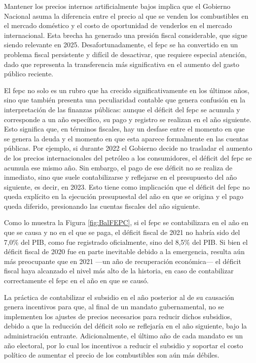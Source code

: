 Mantener los precios internos artificialmente bajos implica que el Gobierno Nacional asuma la diferencia entre el precio al que se venden los combustibles en el mercado doméstico y el costo de oportunidad de venderlos en el mercado internacional. Esta brecha ha generado una presión fiscal considerable, que sigue siendo relevante en 2025. Desafortunadamente, el \gls{fepc} se ha convertido en un problema fiscal persistente y difícil de desactivar, que requiere especial atención, dado que representa la transferencia más significativa en el aumento del gasto público reciente.

El \gls{fepc} no solo es un rubro que ha crecido significativamente en los últimos años, sino que también presenta una peculiaridad contable que genera confusión en la interpretación de las finanzas públicas: aunque el déficit del \gls{fepc} se acumula y corresponde a un año específico, su pago y registro se realizan en el año siguiente. Esto significa que, en términos fiscales, hay un desfase entre el momento en que se genera la deuda y el momento en que esta aparece formalmente en las cuentas públicas. Por ejemplo, si durante 2022 el Gobierno decide no trasladar el aumento de los precios internacionales del petróleo a los consumidores, el déficit del \gls{fepc} se acumula ese mismo año. Sin embargo, el pago de ese déficit no se realiza de inmediato, sino que suele contabilizarse y reflejarse en el presupuesto del año siguiente, es decir, en 2023. Esto tiene como implicación que el déficit del \gls{fepc} no queda explícito en la ejecución presupuestal del año en que se origina y el pago queda diferido, presionando las cuentas fiscales del año siguiente.



Como lo muestra la Figura \ref{fig:BalFEPC}, si el \gls{fepc} se contabilizara en el año en que se causa y no en el que se paga, el déficit fiscal de 2021 no habría sido del 7,0\% del PIB, como fue registrado oficialmente, sino del 8,5\% del PIB. Si bien el déficit fiscal de 2020 fue en parte inevitable debido a la emergencia, resulta aún más preocupante que en 2021 —un año de recuperación económica— el déficit fiscal haya alcanzado el nivel más alto de la historia, en caso de contabilizar correctamente el \gls{fepc} en el año en que se causó. 

La práctica de contabilizar el subsidio en el año posterior al de su causación genera incentivos para que, al final de un mandato gubernamental, no se implementen los ajustes de precios necesarios para reducir dichos subsidios, debido a que la reducción del déficit solo se reflejaría en el año siguiente, bajo la administración entrante. Adicionalmente, el último año de cada mandato es un año electoral, por lo cual los incentivos a reducir el subsidio y soportar el costo político de aumentar el precio de los combustibles son aún más débiles. 

